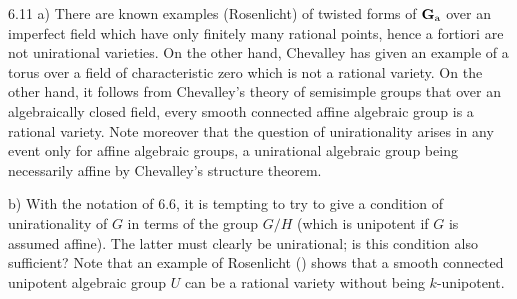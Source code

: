 \begin{remarks}{6.11}\label{XIV.6.11}
\noindent a) There
are known examples
(Rosenlicht) of
twisted forms of
$\mathbf{G}_{\mathrm{a}}$ over an
imperfect field
which have only
finitely many
rational points,
hence a fortiori
are not unirational
varieties. On the
other hand, Chevalley
has given an
example of a torus
over a field of
characteristic zero
which is not a
rational variety.
On the other hand,
it follows from
Chevalley's theory
of semisimple groups
that over an
algebraically closed
field, every smooth
connected affine
algebraic group is
a rational variety.
Note moreover that
the question of
unirationality arises
in any event only
for affine algebraic
groups, a unirational
algebraic group being
necessarily affine
by Chevalley's
structure theorem.

\noindent b) With
the notation of
6.6, it is tempting
to try to give
a condition of
unirationality of
$G$ in terms of
the group $G/H$
(which is unipotent
if $G$ is assumed
affine). The latter
must clearly be
unirational; is
this condition also
sufficient? Note
that an example
of Rosenlicht
(\loccit) shows
that a smooth
connected unipotent
algebraic group $U$
can be a rational
variety without
being $k$-unipotent.


\end{remarks}
